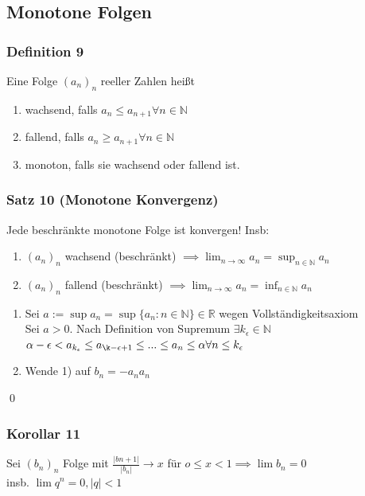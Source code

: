 \documentclass[fleqn]{scrartcl}
\renewenvironment{proof}{{\bfseries Beweis }}{\qed}
\begin{document}
\subsection{Monotone Folgen}
\subsubsection{Definition 9} Eine Folge $(a_n)_n$ reeller Zahlen heißt
\begin{enumerate}[1)]
\item wachsend, falls $a_n \leq a_{n+1} \forall n \in \mathbb{N}$
\item fallend, falls $a_n \geq a_{n+1} \forall n \in \mathbb{N}$
\item monoton, falls sie wachsend oder fallend ist.
\end{enumerate}
\subsubsection{Satz 10 (Monotone Konvergenz)} Jede beschränkte monotone Folge ist konvergen! Insb:
\begin{enumerate}[1)]
\item $(a_n)_n$ wachsend (beschränkt) $\implies \lim_{n\rightarrow\infty} a_n = \sup_{n\in\mathbb{N}}a_n$
\item $(a_n)_n$ fallend (beschränkt) $\implies \lim_{n\rightarrow \infty} a_n = \inf_{n\in\mathbb{N}}a_n$
\end{enumerate}
\begin{proof}
\begin{enumerate}[1)]
\item Sei $a:=\sup a_n = \sup \{a_n: n\in\mathbb{N}\}\in\mathbb{R}$ wegen Vollständigkeitsaxiom\\
Sei $a>0$. Nach Definition von Supremum $\exists k_\epsilon \in \mathbb{N}$\\
$\alpha - \epsilon < a_{k_\epsilon} \leq a_{\k-{\epsilon + 1}} \leq ... \leq a_n \leq \alpha \forall n \leq k_\epsilon$
\item Wende 1) auf $b_n = -a_n a_n$
\end{enumerate}
\end{proof}
\subsubsection{Korollar 11} Sei $(b_n)_n$ Folge mit $\frac{|b{n+1}|}{|b_n|} \rightarrow x$ für $o \leq x < 1 \implies \lim b_n = 0$\\insb. $\lim q^n = 0, |q|<1$
\end{document}
